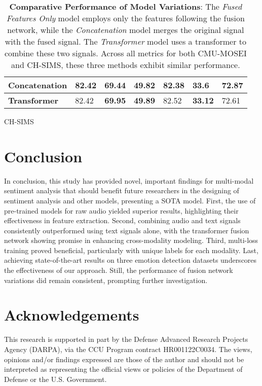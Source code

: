 \documentclass[11pt]{article}
\begin{document}
\begin{table*}
\begin{subtable}{\textwidth}
\begin{tabular}{lllllll}
\textbf{Concatenation} & 82.42 & 69.44 & 49.82 & 82.38 & 33.6 & 72.87 \\ \hline
\textbf{Transformer} & 82.42 & \textbf{69.95} & \textbf{49.89} & 82.52 & \textbf{33.12} & 72.61 \\ \hline
\end{tabular}
\caption{CH-SIMS}
\label{tab:CH-SIMS5}
\end{subtable}
\caption{\textbf{Comparative Performance of Model Variations}: The {\it Fused Features Only} model employs only the features following the fusion network, while the {\it Concatenation} model merges the original signal with the fused signal. The {\it Transformer} model uses a transformer to combine these two signals. Across all metrics for both CMU-MOSEI and CH-SIMS, these three methods exhibit similar performance.}
\label{tab:Performance6}
\end{table*}
\section{Conclusion}
In conclusion, this study has provided novel, important findings for multi-modal sentiment analysis that should benefit future researchers in the designing of sentiment analysis and other models, presenting a SOTA model. First, the use of pre-trained models for raw audio yielded superior results, highlighting their effectiveness in feature extraction. Second, combining audio and text signals consistently outperformed using text signals alone, with the transformer fusion network showing promise in enhancing cross-modality modeling. Third, multi-loss training proved beneficial, particularly with unique labels for each modality. Last, achieving state-of-the-art results on three emotion detection datasets underscores the effectiveness of our approach. Still, the performance of fusion network variations did remain consistent, prompting further investigation. 






\section*{Acknowledgements}

This research is supported in part by the Defense Advanced Research Projects Agency (DARPA), via the CCU Program contract HR001122C0034. The views, opinions and/or findings expressed are those of the author and should not be interpreted as representing the official views or policies of the Department of Defense or the U.S. Government.
\end{document}
